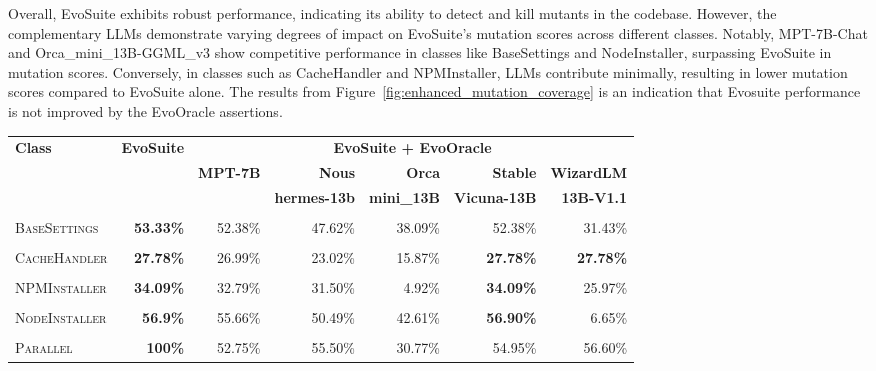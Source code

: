 Overall, EvoSuite exhibits robust performance, indicating its ability to detect and kill mutants in the codebase. However, the complementary LLMs demonstrate varying degrees of impact on EvoSuite's mutation scores across different classes. Notably, MPT-7B-Chat and Orca\_mini\_13B-GGML\_v3 show competitive performance in classes like BaseSettings and NodeInstaller, surpassing EvoSuite in mutation scores. Conversely, in classes such as CacheHandler and NPMInstaller, LLMs contribute minimally, resulting in lower mutation scores compared to EvoSuite alone. The results from Figure~\ref{fig:enhanced_mutation_coverage} is an indication that Evosuite performance is not improved by the EvoOracle assertions.

\begin{table}[H]
\centering

\begin{tabular}{| l | r | r | r | r | r | r |}
\hline
\multirow{2}{*}{\textbf{Class}} & \multirow{2}{*}{\textbf{EvoSuite}} & \multicolumn{5}{c|}{\textbf{EvoSuite + EvoOracle}} \\ %
\cline{3-7} %
 &  & \textbf{MPT-7B} & \textbf{Nous} & \textbf{Orca} & \textbf{Stable} & \textbf{WizardLM} \\
 &  &  & \textbf{hermes-13b} & \textbf{mini\_13B} & \textbf{Vicuna-13B} & \textbf{13B-V1.1} \\
\hline
\scriptsize\textsc{} &  &  &  &  &  &  \\
\scriptsize\textsc{BaseSettings} & \textbf{53.33\%} & 52.38\% & 47.62\% & 38.09\% & 52.38\% & 31.43\% \\
\hline
\scriptsize\textsc{} &  &  &  &  &  &  \\
\scriptsize\textsc{CacheHandler} & \textbf{27.78\%} & 26.99\% & 23.02\% & 15.87\% & \textbf{27.78\%} & \textbf{27.78\%}  \\
\hline
\scriptsize\textsc{} &  &  &  &  &  &  \\
\scriptsize\textsc{NPMInstaller} & \textbf{34.09\%} & 32.79\% & 31.50\% & 4.92\% & \textbf{34.09\%} & 25.97\%  \\
\hline
\scriptsize\textsc{} &  &  &  &  &  &  \\
\scriptsize\textsc{NodeInstaller} & \textbf{56.9\%} & 55.66\% & 50.49\% & 42.61\% & \textbf{56.90\%} & 6.65\%  \\
\hline
\scriptsize\textsc{} &  &  &  &  &  &  \\
\scriptsize\textsc{Parallel} & \textbf{100\%} & 52.75\% & 55.50\% & 30.77\% & 54.95\% & 56.60\%  \\

\end{tabular}
\end{table}
